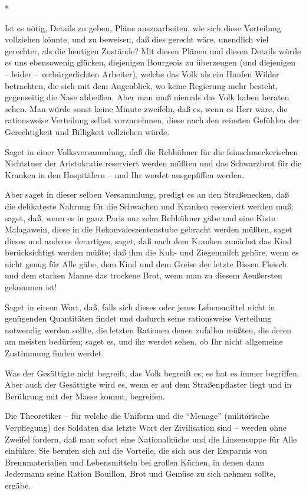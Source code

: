 \documentclass{scrbook}
\begin{document}
\begin{center}*\end{center}

Ist es nötig, Details zu geben, Pläne auszuarbeiten, wie sich diese Verteilung vollziehen könnte, und zu beweisen, daß dies gerecht wäre, unendlich viel gerechter, als die heutigen Zustände? Mit diesen Plänen und diesen Details würde es uns ebensowenig glücken, diejenigen Bourgeois zu überzeugen (und diejenigen – leider – verbürgerlichten Arbeiter), welche das Volk als ein Haufen Wilder betrachten, die sich mit dem Augenblick, wo keine Regierung mehr besteht, gegenseitig die Nase abbeißen. Aber man muß niemals das Volk haben beraten sehen. Man würde sonst keine Minute zweifeln, daß es, wenn es Herr wäre, die rationsweise Verteilung selbst vorzunehmen, diese nach den reinsten Gefühlen der Gerechtigkeit und Billigkeit vollziehen würde.

Saget in einer Volksversammlung, daß die Rebhühner für die feinschmeckerischen Nichtstuer der Aristokratie reserviert werden müßten und das Schwarzbrot für die Kranken in den Hospitälern – und Ihr werdet ausgepfiffen werden.

Aber saget in dieser selben Versammlung, predigt es an den Straßenecken, daß die delikateste Nahrung für die Schwachen und Kranken reserviert werden muß; saget, daß, wenn es in ganz Paris nur zehn Rebhühner gäbe und eine Kiste Malagawein, diese in die Rekonvaleszentenstube gebracht werden müßten, saget dieses und anderes derartiges, saget, daß nach dem Kranken zunächst das Kind berücksichtigt werden müßte; daß ihm die Kuh- und Ziegenmilch gehöre, wenn es nicht genug für Alle gäbe, dem Kind und dem Greise der letzte Bissen Fleisch und dem starken Manne das trockene Brot, wenn man zu diesem Aeußersten gekommen ist!

Saget in einem Wort, daß, falls sich dieses oder jenes Lebensmittel nicht in genügenden Quantitäten findet und dadurch seine rationsweise Verteilung notwendig werden sollte, die letzten Rationen denen zufallen müßten, die deren am meisten bedürfen; saget es, und ihr werdet sehen, ob Ihr nicht allgemeine Zustimmung finden werdet.

Was der Gesättigte nicht begreift, das Volk begreift es; es hat es immer begriffen. Aber auch der Gesättigte wird es, wenn er auf dem Straßenpflaster liegt und in Berührung mit der Masse kommt, begreifen.

Die Theoretiker – für welche die Uniform und die ``Menage'' (militärische Verpflegung) des Soldaten das letzte Wort der Zivilisation sind – werden ohne Zweifel fordern, daß man sofort eine Nationalküche und die Linsensuppe für Alle einführe. Sie berufen sich auf die Vorteile, die sich aus der Ersparnis von Brennmaterialien und Lebensmitteln bei großen Küchen, in denen dann Jedermann seine Ration Bouillon, Brot und Gemüse zu sich nehmen sollte, ergäbe.
\end{document}
